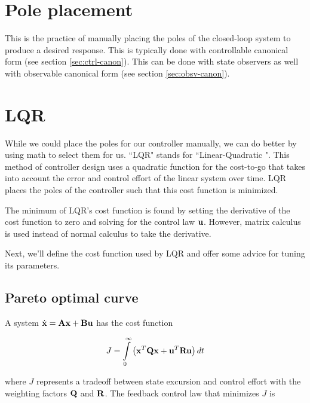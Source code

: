 \section{Pole placement}

This is the practice of manually placing the poles of the closed-loop system to
produce a desired response. This is typically done with controllable canonical
form (see section \ref{sec:ctrl-canon}). This can be done with state observers
as well with observable canonical form (see section \ref{sec:obsv-canon}).

\section{LQR}

While we could place the poles for our controller manually, we can do better by
using math to select them for us. ``LQR" stands for ``Linear-Quadratic
". This method of controller design uses a
quadratic function for the cost-to-go that takes into account the error and
control effort of the linear system over time. LQR places the poles of the
controller such that this cost function is minimized.

The minimum of LQR's cost function is found by setting the derivative of the
cost function to zero and solving for the control law $\mathbf{u}$. However, matrix
calculus is used instead of normal calculus to take the derivative.

Next, we'll define the cost function used by LQR and offer some advice for
tuning its parameters.

\subsection{Pareto optimal curve}

A system $\dot{\mathbf{x}} = \mathbf{A}\mathbf{x} + \mathbf{B}\mathbf{u}$ has the cost function

\begin{equation*}
  J = \int\limits_0^\infty \left(\mathbf{x}^T\mathbf{Q}\mathbf{x} +
    \mathbf{u}^T\mathbf{R}\mathbf{u}\right) dt
\end{equation*}

where $J$ represents a tradeoff between \gls{state} excursion and control effort
with the weighting factors $\mathbf{Q}$ and $\mathbf{R}$. The feedback \gls{control
law} that minimizes $J$ is

